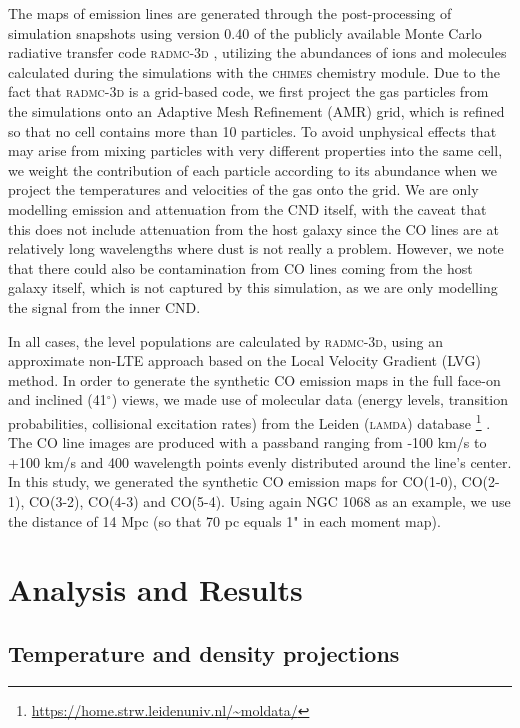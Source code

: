 \documentclass[fleqn,usenatbib]{mnras}
\begin{document}
The maps of emission lines are generated through the post-processing of simulation snapshots using version 0.40 of the publicly available Monte Carlo radiative transfer code  \textsc{radmc-3d} \citep{Dullemond2012}, utilizing the abundances of ions and molecules calculated during the simulations with the \textsc{chimes} chemistry module. 
Due to the fact that \textsc{radmc-3d} is a grid-based code, we first project the gas particles from the simulations onto an Adaptive Mesh Refinement (AMR) grid, which is refined so that no cell contains more than 10 particles. 
To avoid unphysical effects that may arise from mixing particles with very different properties into the same cell, we weight the contribution of each particle according to its abundance when we project the temperatures and velocities of the gas onto the grid. We are only modelling emission and attenuation from the CND itself, with the caveat that this does not include attenuation from the host galaxy since the CO lines are at relatively long wavelengths where dust is not really a problem. However, we note that there could also be contamination from CO lines coming from the host galaxy itself, which is not captured by this simulation, as we are only modelling the signal from the inner CND.

In all cases, the level populations are calculated by \textsc{radmc-3d}, using an approximate non-LTE approach based on the Local Velocity Gradient (LVG) method. In order to generate the synthetic CO emission maps in the full face-on and inclined (41$^\circ$) views, we made use of molecular data (energy levels, transition probabilities, collisional excitation rates) from the Leiden (\textsc{lamda}) database \footnote{\url{https://home.strw.leidenuniv.nl/\~moldata/}} \citep{Schoier2005}. 
The CO line images are produced with a passband ranging from -100 km/s to +100 km/s and 400 wavelength points evenly distributed around the line's center. In this study, we generated the synthetic CO emission maps for CO(1-0), CO(2-1), CO(3-2), CO(4-3) and CO(5-4). Using again NGC 1068 as an example, we use the distance of 14 Mpc (so that 70 pc equals 1" in each moment map). 

\section{Analysis and Results} \label{sec:results1}
\subsection{Temperature and density  projections}
\end{document}
